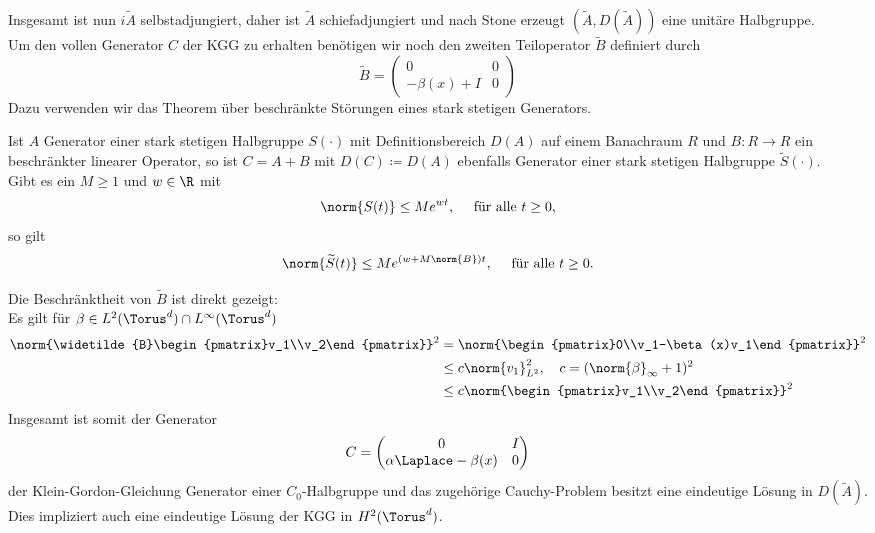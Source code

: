 Insgesamt ist nun $i\widetilde{A}$ selbstadjungiert, daher ist $\widetilde{A}$ schiefadjungiert und nach Stone erzeugt $(\widetilde{A},D(\widetilde{A}))$ eine unitäre Halbgruppe.\\[0.3cm] 
Um den vollen Generator $C$ der KGG zu erhalten benötigen wir noch den zweiten Teiloperator $\widetilde{B}$ definiert durch
\[\widetilde{B}=\begin{pmatrix}0 & 0\\-\beta(x)+I & 0\end{pmatrix}\]
Dazu verwenden wir das Theorem über beschränkte Störungen eines stark stetigen Generators.
\begin{maththeorem}
\label{th:engelnagelbounded}
Ist $A$ Generator einer stark stetigen Halbgruppe $S(\cdot)$ mit Definitionsbereich $D(A)$ auf einem Banachraum $R$ und $B\colon R\to R$ ein beschränkter linearer Operator, so ist
$C=A+B$ mit $D(C)\coloneqq D(A)$ ebenfalls Generator einer stark stetigen Halbgruppe $\widetilde{S}(\cdot)$.\\
Gibt es ein $M\ge 1$ und $w\in\R$ mit
\[\norm{S(t)}\le Me^{wt},\quad \text{ für alle } t\ge 0,\]
so gilt
\[\norm{\widetilde{S}(t)}\le Me^{(w+M\norm{B})t},\quad \text{ für alle } t\ge 0.\]
\end{maththeorem}Die Beschränktheit von $\widetilde{B}$ ist direkt gezeigt:\\
Es gilt für $\beta\in L^2(\Torus^d)\cap L^\infty(\Torus^d)$
\begin{align*}
\norm{\widetilde{B}\begin{pmatrix}v_1\\v_2\end{pmatrix}}^2&=\norm{\begin{pmatrix}0\\v_1-\beta(x)v_1\end{pmatrix}}^2\\
&\le c\norm{v_1}_{L^2}^2, \quad c=(\norm{\beta}_{\infty}+1)^2\\
&\le c\norm{\begin{pmatrix}v_1\\v_2\end{pmatrix}}^2
\end{align*}
Insgesamt ist somit der Generator 
\[C=\begin{pmatrix}0 & I\\ \alpha\Laplace - \beta(x) & 0\end{pmatrix}\]
der Klein-Gordon-Gleichung Generator einer $C_0$-Halbgruppe und das zugehörige Cauchy-Problem besitzt eine eindeutige Lösung in $D(\widetilde{A})$. Dies impliziert auch eine eindeutige Lösung der KGG in $H^2(\Torus^d)$.
